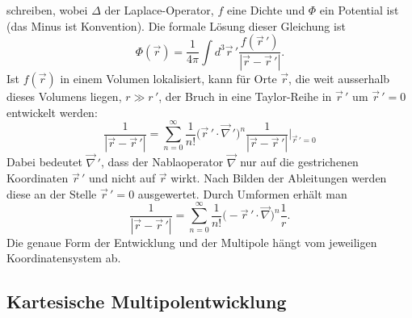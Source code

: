 \noindent
schreiben, wobei \(\Delta\) der Laplace-Operator, \(f\) eine Dichte und \(\Phi\) ein Potential ist (das Minus ist Konvention).
Die formale Lösung dieser Gleichung ist
\begin{equation*}
\Phi (\vec{r})
=
\frac{1}{4\pi}
\int d^3 \vec{r}\,'
\frac{f (\vec{r}\,')}{|\vec{r} - \vec{r}\,'|}.
\end{equation*}
Ist \(f (\vec{r})\) in einem Volumen lokalisiert, kann für Orte
\(\vec{r}\), die weit ausserhalb dieses Volumens liegen, \(r \gg
r\,'\), der Bruch in eine Taylor-Reihe in \(\vec{r}\,'\) um
\(\vec{r}\,' = 0\) entwickelt werden:
\begin{equation*}
\frac{1}{|\vec{r} - \vec{r}\,'|}
=
\sum_{n=0}^{\infty}
\frac{1}{n!}
\bigl( \vec{r}\,' \cdot \vec{\nabla}\,' \bigr)^n
 \frac{1}{|\vec{r} - \vec{r}\,'|} \bigg|_{\vec{r}\,'=0}
\end{equation*}
Dabei bedeutet \(\vec{\nabla}\,'\), dass der Nablaoperator
\(\vec{\nabla}\) nur auf die gestrichenen Koordinaten \(\vec{r}\,'\)
und nicht auf \(\vec{r}\) wirkt.
Nach Bilden der Ableitungen werden diese an der Stelle \(\vec{r}\,' = 0\) ausgewertet.
Durch Umformen erhält man
\begin{equation*}
\frac{1}{|\vec{r} - \vec{r}\,'|}
=
\sum_{n=0}^{\infty}
\frac{1}{n!}
\bigl( - \vec{r}\,' \cdot \vec{\nabla} \bigr)^n
\frac{1}{r}.
\end{equation*}
Die genaue Form der Entwicklung und der Multipole hängt vom jeweiligen Koordinatensystem ab.

\subsection{Kartesische Multipolentwicklung
\label{planet:subsection:kartentwicklung}}
%

